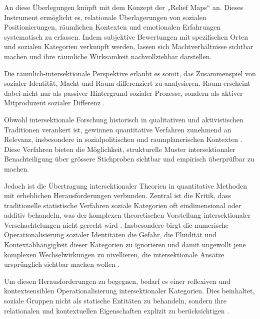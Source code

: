 An diese Überlegungen knüpft \textcite{rodo-de-zarateDevelopingGeographiesIntersectionality2014} mit dem Konzept der „Relief Maps“ an. Dieses Instrument ermöglicht es, relationale Überlagerungen von sozialen Positionierungen, räumlichen Kontexten und emotionalen Erfahrungen systematisch zu erfassen. Indem subjektive Bewertungen mit spezifischen Orten und sozialen Kategorien verknüpft werden, lassen sich Machtverhältnisse sichtbar machen und ihre räumliche Wirksamkeit nachvollziehbar darstellen.

Die räumlich-intersektionale Perspektive erlaubt es somit, das Zusammenspiel von sozialer Identität, Macht und Raum differenziert zu analysieren. Raum erscheint dabei nicht nur als passiver Hintergrund sozialer Prozesse, sondern als aktiver Mitproduzent sozialer Differenz \parencite{rodo-de-zarateIntersectionalityFeministGeographies2018}.

\vspace{2em}

Obwohl intersektionale Forschung historisch in qualitativen und aktivistischen Traditionen verankert ist, gewinnen quantitative Verfahren zunehmend an Relevanz, insbesondere in sozialpolitischen und raumplanerischen Kontexten \parencite{bauerIntersectionalityQuantitativeResearch2021}. Diese Verfahren bieten die Möglichkeit, strukturelle Muster intersektionaler Benachteiligung über grössere Stichproben sichtbar und empirisch überprüfbar zu machen.

Jedoch ist die Übertragung intersektionaler Theorien in quantitative Methoden mit erheblichen Herausforderungen verbunden. Zentral ist die Kritik, dass traditionelle statistische Verfahren soziale Kategorien oft eindimensional oder additiv behandeln, was der komplexen theoretischen Vorstellung intersektionaler Verschachtelungen nicht gerecht wird \parencite{hancockWhenMultiplicationDoesnt2007, bowlegInvitedReflectionQuantifying2016}. Insbesondere birgt die numerische Operationalisierung sozialer Identitäten die Gefahr, die Fluidität und Kontextabhängigkeit dieser Kategorien zu ignorieren und damit ungewollt jene komplexen Wechselwirkungen zu nivellieren, die intersektionale Ansätze ursprünglich sichtbar machen wollen \parencite{scottIntersectionalityQuantitativeMethods2017}.

Um diesen Herausforderungen zu begegnen, bedarf es einer reflexiven und kontextsensiblen Operationalisierung intersektionaler Kategorien. Dies beinhaltet, soziale Gruppen nicht als statische Entitäten zu behandeln, sondern ihre relationalen und kontextuellen Eigenschaften explizit zu berücksichtigen \parencite{rodo-de-zarateDevelopingGeographiesIntersectionality2014, websterCenteringSocialtechnicalRelations2021}.


